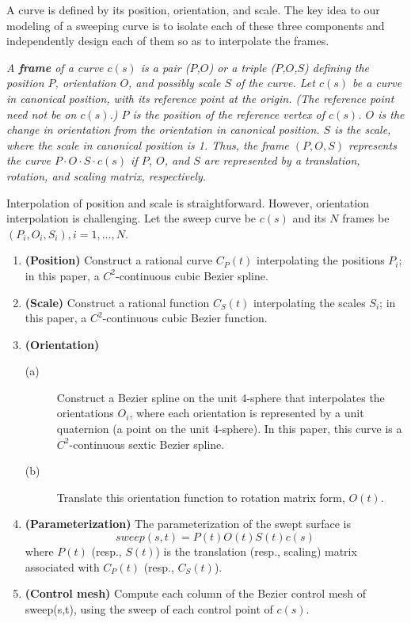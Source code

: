 A curve is defined by its position, orientation, and scale.
The key idea to our modeling of a sweeping curve is to isolate each
of these three components and independently design each of them so as
to interpolate the frames.

\begin{defn2}
{\em
A {\bf frame} of a curve $c(s)$ is a pair ($P$,$O$) or a triple 
($P$,$O$,$S$)
defining the position $P$, orientation $O$, and possibly scale $S$ of the curve.
Let $c(s)$ be a curve in canonical position, with its reference point
at the origin.  (The reference point need not be on $c(s)$.)
$P$ is the position of the reference vertex of $c(s)$.
$O$ is the change in orientation from the orientation in canonical position.
$S$ is the scale, where the scale in canonical position is 1.
Thus, the frame $(P,O,S)$ represents the curve 
$P \cdot O \cdot S \cdot c(s)$
if $P$, $O$, and $S$ are represented by a translation, rotation, and scaling 
matrix, respectively.
}
\end{defn2}

Interpolation of position and scale is straightforward.
However, orientation interpolation is challenging.
Let the sweep curve be $c(s)$ and its
$N$ frames be $(P_i,O_i,S_i), i = 1,\ldots,N$.

\begin{enumerate}
\item
	{\bf (Position)} Construct a rational curve $C_{P}(t)$
	interpolating the positions $P_i$;
	in this paper, a $C^2$-continuous cubic Bezier spline.
\item
	{\bf (Scale)} Construct a rational function $C_{S}(t)$
	interpolating the scales $S_i$; in this paper, 
	a $C^2$-continuous cubic Bezier function.
\item
	{\bf (Orientation)}
\begin{description}
\item[(a)]
	Construct a Bezier spline on the unit 4-sphere
	that interpolates the orientations $O_i$, where each 
	orientation is represented by a unit quaternion
	(a point on the unit 4-sphere).
	In this paper, this curve is a $C^2$-continuous sextic Bezier spline.
\item[(b)]
	Translate this orientation function to rotation matrix form, $O(t)$.
\end{description}
\item 
	{\bf (Parameterization)}
	The parameterization of the swept surface is
\begin{equation}
\label{eqn:matrix}
	sweep(s,t) = P(t)O(t)S(t)c(s)
\end{equation}
	where $P(t)$ (resp., $S(t)$) is the translation (resp., scaling)
	matrix associated with $C_{P}(t)$ (resp., $C_{S}(t)$).
\item
	{\bf (Control mesh)}
	Compute each column of the Bezier control mesh of sweep(s,t),
	using the sweep of each control point of $c(s)$.
\end{enumerate}

